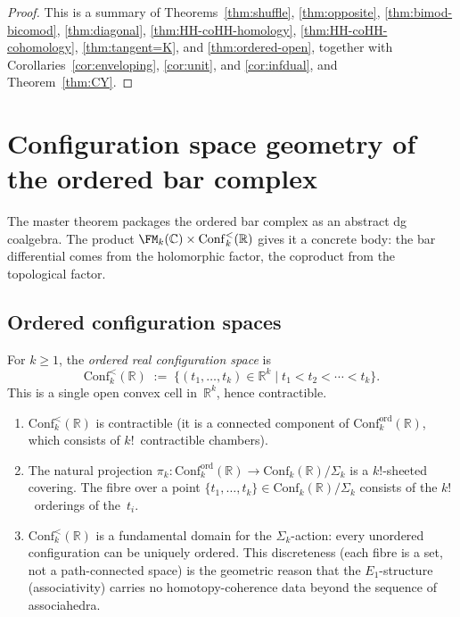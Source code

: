 \begin{proof}
This is a summary of Theorems~\ref{thm:shuffle}, \ref{thm:opposite},
\ref{thm:bimod-bicomod}, \ref{thm:diagonal}, \ref{thm:HH-coHH-homology},
\ref{thm:HH-coHH-cohomology}, \ref{thm:tangent=K}, and \ref{thm:ordered-open}, together with
Corollaries~\ref{cor:enveloping}, \ref{cor:unit}, and \ref{cor:infdual}, and
Theorem~\ref{thm:CY}.
\end{proof}

\section{Configuration space geometry of the ordered bar complex}
\label{sec:config-space-geometry}

The master theorem packages the ordered bar complex as an abstract
dg coalgebra. The product
$\FM_k(\mathbb C)\times\mathrm{Conf}_k^{<}(\mathbb R)$
gives it a concrete body: the bar differential comes from the
holomorphic factor, the coproduct from the topological factor.

\subsection{Ordered configuration spaces}
\label{subsec:ordered-config-spaces-geom}

\begin{definition}
\ClaimStatusProvedHere
\label{def:ordered-real-config}
For $k\ge 1$, the \emph{ordered real configuration space} is
\[
\mathrm{Conf}_k^{<}(\mathbb R)
\;:=\;
\bigl\{(t_1,\dots,t_k)\in\mathbb R^k
\;\big|\;
t_1<t_2<\cdots<t_k\bigr\}.
\]
This is a single open convex cell in~$\mathbb R^k$,
hence contractible.
\end{definition}

\begin{proposition}
\label{prop:ordered-real-config-topology}
\begin{enumerate}[label=\textup{(\roman*)}]
\item $\mathrm{Conf}_k^{<}(\mathbb R)$ is contractible
 (it is a connected component of
 $\mathrm{Conf}_k^{\mathrm{ord}}(\mathbb R)$, which
 consists of $k!$~contractible chambers).
\item The natural projection
 $\pi_k\colon \mathrm{Conf}_k^{\mathrm{ord}}(\mathbb R)
 \to \mathrm{Conf}_k(\mathbb R)/\Sigma_k$
 is a $k!$-sheeted covering. The fibre over a point
 $\{t_1,\dots,t_k\}\in\mathrm{Conf}_k(\mathbb R)/\Sigma_k$
 consists of the $k!$~orderings of the~$t_i$.
\item $\mathrm{Conf}_k^{<}(\mathbb R)$ is a fundamental domain
 for the $\Sigma_k$-action: every unordered configuration
 can be uniquely ordered. This discreteness (each fibre
 is a set, not a path-connected space) is the geometric
 reason that the $E_1$-structure (associativity) carries no
 homotopy-coherence data beyond the sequence of
 associahedra.
\end{enumerate}
\end{proposition}

